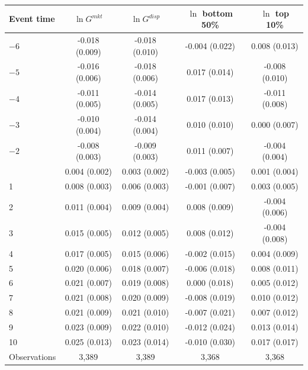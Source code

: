 \begin{tabular}{lcccc}
\toprule
Event time & $\ln G^{mkt}$ & $\ln G^{disp}$ & $\ln$ bottom 50\% & $\ln$ top 10\% \\
\midrule
$-6$ & -0.018\sym{*} (0.009) & -0.018\sym{*} (0.010) & -0.004 (0.022) & 0.008 (0.013) \\
$-5$ & -0.016\sym{***} (0.006) & -0.018\sym{***} (0.006) & 0.017 (0.014) & -0.008 (0.010) \\
$-4$ & -0.011\sym{**} (0.005) & -0.014\sym{***} (0.005) & 0.017 (0.013) & -0.011 (0.008) \\
$-3$ & -0.010\sym{**} (0.004) & -0.014\sym{***} (0.004) & 0.010 (0.010) & 0.000 (0.007) \\
$-2$ & -0.008\sym{***} (0.003) & -0.009\sym{***} (0.003) & 0.011 (0.007) & -0.004 (0.004) \\
\addlinespace
0 & 0.004\sym{*} (0.002) & 0.003 (0.002) & -0.003 (0.005) & 0.001 (0.004) \\
1 & 0.008\sym{**} (0.003) & 0.006\sym{*} (0.003) & -0.001 (0.007) & 0.003 (0.005) \\
2 & 0.011\sym{***} (0.004) & 0.009\sym{**} (0.004) & 0.008 (0.009) & -0.004 (0.006) \\
3 & 0.015\sym{***} (0.005) & 0.012\sym{**} (0.005) & 0.008 (0.012) & -0.004 (0.008) \\
4 & 0.017\sym{***} (0.005) & 0.015\sym{**} (0.006) & -0.002 (0.015) & 0.004 (0.009) \\
5 & 0.020\sym{***} (0.006) & 0.018\sym{***} (0.007) & -0.006 (0.018) & 0.008 (0.011) \\
6 & 0.021\sym{***} (0.007) & 0.019\sym{**} (0.008) & 0.000 (0.018) & 0.005 (0.012) \\
7 & 0.021\sym{***} (0.008) & 0.020\sym{**} (0.009) & -0.008 (0.019) & 0.010 (0.012) \\
8 & 0.021\sym{**} (0.009) & 0.021\sym{**} (0.010) & -0.007 (0.021) & 0.007 (0.012) \\
9 & 0.023\sym{**} (0.009) & 0.022\sym{**} (0.010) & -0.012 (0.024) & 0.013 (0.014) \\
10 & 0.025\sym{**} (0.013) & 0.023\sym{*} (0.014) & -0.010 (0.030) & 0.017 (0.017) \\
\midrule
Observations & 3,389 & 3,389 & 3,368 & 3,368 \\
\bottomrule
\end{tabular}
